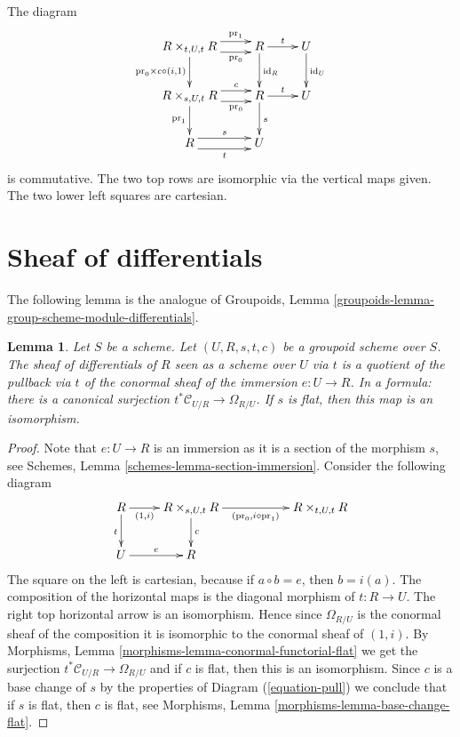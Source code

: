 \documentclass{stacks-project}
\theoremstyle{plain}
\newtheorem{lemma}[subsection]{Lemma}
\theoremstyle{definition}
\theoremstyle{remark}
\numberwithin{equation}{subsection}
\begin{document}
\medskip\noindent
The diagram
\begin{equation}
\label{equation-pull}
\vcenter{
\xymatrix{
R \times_{t, U, t} R
\ar@<1ex>[r]^-{\text{pr}_1} \ar@<-1ex>[r]_-{\text{pr}_0}
\ar[d]_{\text{pr}_0 \times c \circ (i, 1)} &
R \ar[r]^t \ar[d]^{\text{id}_R} &
U \ar[d]^{\text{id}_U} \\
R \times_{s, U, t} R
\ar@<1ex>[r]^-c \ar@<-1ex>[r]_-{\text{pr}_0} \ar[d]_{\text{pr}_1} &
R \ar[r]^t \ar[d]^s &
U \\
R \ar@<1ex>[r]^s \ar@<-1ex>[r]_t &
U
}
}
\end{equation}
is commutative. The two top rows are isomorphic via the vertical maps given.
The two lower left squares are cartesian.





\section{Sheaf of differentials}
\label{section-differentials}

\noindent
The following lemma is the analogue of
Groupoids, Lemma \ref{groupoids-lemma-group-scheme-module-differentials}.

\begin{lemma}
\label{lemma-sheaf-differentials}
Let $S$ be a scheme.
Let $(U, R, s, t, c)$ be a groupoid scheme over $S$.
The sheaf of differentials of $R$ seen as a scheme over
$U$ via $t$ is a quotient of the pullback via $t$ of the conormal sheaf of
the immersion $e : U \to R$. In a formula: there is a canonical surjection
$t^*\mathcal{C}_{U/R} \to \Omega_{R/U}$. If $s$ is flat, then
this map is an isomorphism.
\end{lemma}

\begin{proof}
Note that $e : U \to R$ is an immersion as it is a section
of the morphism $s$, see
Schemes, Lemma \ref{schemes-lemma-section-immersion}.
Consider the following diagram
$$
\xymatrix{
R \ar[r]_-{(1, i)} \ar[d]_t &
R \times_{s, U, t} R \ar[d]^c \ar[rr]_{(\text{pr}_0, i \circ \text{pr}_1)} & &
R \times_{t, U, t} R \\
U \ar[r]^e &
R
}
$$
The square on the left is cartesian, because if $a \circ b = e$, then
$b = i(a)$. The composition of the horizontal maps is the diagonal
morphism of $t : R \to U$. The right top horizontal arrow is an
isomorphism. Hence since $\Omega_{R/U}$ is the conormal sheaf of the
composition it is isomorphic to the conormal sheaf of
$(1, i)$. By
Morphisms, Lemma \ref{morphisms-lemma-conormal-functorial-flat}
we get the surjection $t^*\mathcal{C}_{U/R} \to \Omega_{R/U}$
and if $c$ is flat, then this is an isomorphism. Since $c$ is a base change
of $s$ by the properties of Diagram (\ref{equation-pull})
we conclude that if $s$ is flat, then $c$ is flat, see
Morphisms, Lemma \ref{morphisms-lemma-base-change-flat}.
\end{proof}
\end{document}
